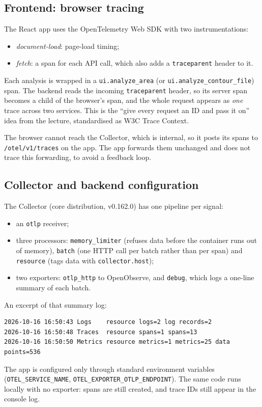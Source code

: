 \documentclass[manuscript,screen]{acmart}
\begin{document}
\subsection{Frontend: browser tracing}
The React app uses the OpenTelemetry Web SDK with two instrumentations:
\begin{itemize}
\item \emph{document-load}: page-load timing;
\item \emph{fetch}: a span for each API call, which also adds a
  \texttt{traceparent} header to it.
\end{itemize}
Each analysis is wrapped in a \texttt{ui.analyze\_area} (or
\texttt{ui.analyze\_contour\_file}) span. The backend reads the incoming
\texttt{traceparent} header, so its server span becomes a child of the
browser's span, and the whole request appears as \emph{one} trace across
two services. This is the ``give every request an ID and pass it on''
idea from the lecture, standardised as W3C Trace Context.

The browser cannot reach the Collector, which is internal, so it posts its
spans to \texttt{/otel/v1/traces} on the app. The app forwards them
unchanged and does not trace this forwarding, to avoid a feedback loop.

\subsection{Collector and backend configuration}
The Collector (core distribution, v0.162.0) has one pipeline per signal:
\begin{itemize}
\item an \texttt{otlp} receiver;
\item three processors: \texttt{memory\_limiter} (refuses data before the
  container runs out of memory), \texttt{batch} (one HTTP call per batch
  rather than per span) and \texttt{resource} (tags data with
  \texttt{collector.host});
\item two exporters: \texttt{otlp\_http} to OpenObserve, and
  \texttt{debug}, which logs a one-line summary of each batch.
\end{itemize}
An excerpt of that summary log:
\begin{lstlisting}
2026-10-16 16:50:43 Logs    resource logs=2 log records=2
2026-10-16 16:50:48 Traces  resource spans=1 spans=13
2026-10-16 16:50:50 Metrics resource metrics=1 metrics=25 data points=536
\end{lstlisting}

The app is configured only through standard environment variables
(\texttt{OTEL\_SERVICE\_NAME}, \texttt{OTEL\_EXPORTER\_OTLP\_ENDPOINT}).
The same code runs locally with no exporter: spans are still created, and
trace IDs still appear in the console log.
\end{document}
